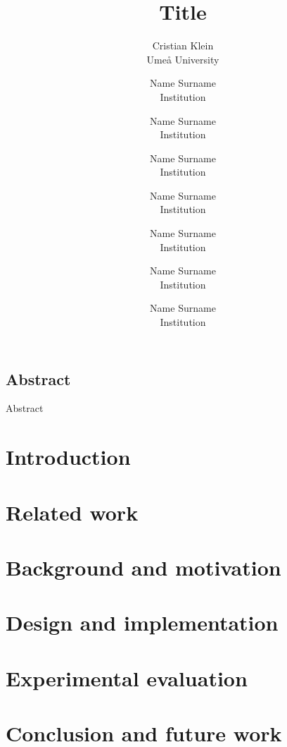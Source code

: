 \documentclass[letterpaper,twocolumn,10pt]{article}
\begin{document}
\date{}
\title{\Large \bf Title}

\author{
{\rm Cristian Klein}\\
Ume{\aa} University
\and
{\rm Name Surname}\\
Institution
\and
{\rm Name Surname}\\
Institution
\and
{\rm Name Surname}\\
Institution
\and
{\rm Name Surname}\\
Institution
\and
{\rm Name Surname}\\
Institution
\and
{\rm Name Surname}\\
Institution
\and
{\rm Name Surname}\\
Institution
} %

\maketitle



\subsection*{Abstract}
Abstract

\section{Introduction}
\label{sec:Introduction}


\section{Related work}
\label{sec:Related}


\section{Background and motivation}
\label{sec:ProblemStatement}


\section{Design and implementation}
\label{sec:Solution}


\section{Experimental evaluation}
\label{sec:Results}


\section{Conclusion and future work}
\label{sec:Conclusion}


\printbibliography
\end{document}
